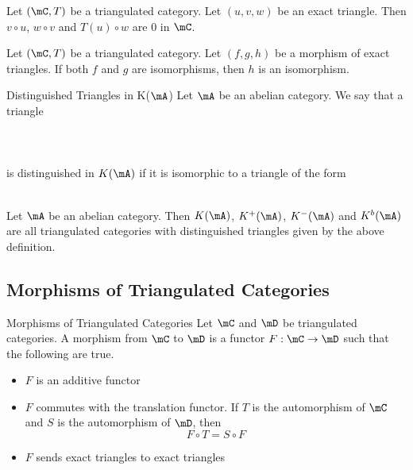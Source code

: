 \documentclass[a4paper]{article}
\begin{document}
\begin{lmm}{}{} Let $(\mC,T)$ be a triangulated category. Let $(u,v,w)$ be an exact triangle. Then $v\circ u$, $w\circ v$ and $T(u)\circ w$ are $0$ in $\mC$. 
\end{lmm}

\begin{lmm}{}{} Let $(\mC,T)$ be a triangulated category. Let $(f,g,h)$ be a morphism of exact triangles. If both $f$ and $g$ are isomorphisms, then $h$ is an isomorphism. 
\end{lmm}

\begin{defn}{Distinguished Triangles in K($\mA$)}{} Let $\mA$ be an abelian category. We say that a triangle \\~\\
\\~\\
is distinguished in $K(\mA)$ if it is isomorphic to a triangle of the form \\~\\
\end{defn}

\begin{lmm}{}{} Let $\mA$ be an abelian category. Then $K(\mA)$, $K^+(\mA)$, $K^-(\mA)$ and $K^b(\mA)$ are all triangulated categories with distinguished triangles given by the above definition. 
\end{lmm}

\subsection{Morphisms of Triangulated Categories}
\begin{defn}{Morphisms of Triangulated Categories}{} Let $\mC$ and $\mD$ be triangulated categories. A morphism from $\mC$ to $\mD$ is a functor $F:\mC\to\mD$ such that the following are true. 
\begin{itemize}
\item $F$ is an additive functor
\item $F$ commutes with the translation functor. If $T$ is the automorphism of $\mC$ and $S$ is the automorphism of $\mD$, then $$F\circ T=S\circ F$$
\item $F$ sends exact triangles to exact triangles
\end{itemize}
\end{defn}
\end{document}
